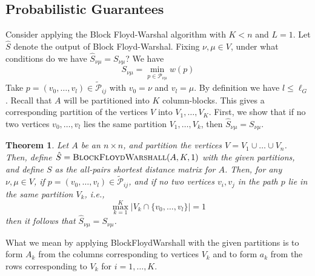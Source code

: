 \documentclass{article} %
\newtheorem{theorem}{Theorem}[section]
\begin{document}
\subsection{Probabilistic Guarantees}

Consider applying the Block Floyd-Warshal algorithm with $K < n$ and $L = 1$.
Let $\hat{S}$ denote the output of Block Floyd-Warshal.
Fixing $\nu, \mu \in V$, under what conditions do we have $\hat{S}_{\nu \mu} = S_{\nu \mu}$?
We have
\[
S_{\nu \mu} = \min_{p \in \mathcal{P}_{\nu \mu}} w(p)
\]
Take $p = (v_0, \hdots, v_l) \in \tilde{\mathcal{P}}_{ij}$ with $v_0 =
\nu$ and $v_l = \mu$.  By definition we have $l \leq \ell_G$.
Recall that $A$ will be partitioned into $K$ column-blocks.
This gives a corresponding partition of the vertices $V$ into $V_1,\hdots, V_K$.
First, we show that if no two vertices $v_0, \hdots, v_l$ lies the same partition $V_1,\hdots, V_k$,
then $\hat{S}_{\nu \mu} = S_{\nu \mu}$.  

\begin{theorem}
Let $A$ be an $n \times n$, and partition the vertices $V = V_1 \cup
\hdots \cup V_n$.  Then, define $\hat{S} = \text{\sc
  BlockFloydWarshall}(A, K, 1)$ with the given partitions, and define
$S$ as the all-pairs shortest distance matrix for $A$.  Then, for any
$\nu, \mu \in V$, if $p = (v_0,\hdots, v_l) \in \tilde{\mathcal{P}}_{ij}$,
and if no two vertices $v_i, v_j$ in the path $p$ lie in the same
partition $V_k$, i.e.,
\[
\max_{k=1}^K |V_k \cap \{v_0,\hdots, v_l\}| = 1
\]
then it follows that $\hat{S}_{\nu \mu} = S_{\nu \mu}$.
\end{theorem}

What we mean by applying {\sc BlockFloydWarshall} with the given
partitions is to form $A_k$ from the columns corresponding to vertices
$V_k$ and to form $a_k$ from the rows corresponding to $V_k$ for $i =
1,\hdots, K$.
\end{document}
